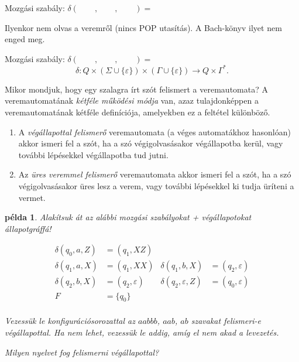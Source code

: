 \documentclass[a4paper]{article}
\newtheorem{pelda}{példa}[section]
\begin{document}
Mozgási szabály: $\delta(\qquad, \qquad, \qquad) = $\\[2em]

 \qquad
\begin{minipage}{.5\linewidth}
    Ilyenkor nem olvas a veremről (nincs POP utasítás). A Bach-könyv
    ilyet nem enged meg.
\end{minipage}

Mozgási szabály: $\delta(\qquad, \qquad, \qquad) = $\\[2em]

\[\delta:
 Q\times (\Sigma \cup \{\varepsilon\}) \times (\Gamma \cup \{\varepsilon\})
 \longrightarrow
 Q \times \Gamma^*.
\]

Mikor mondjuk, hogy egy szalagra írt szót felismert a veremautomata?
A veremautomatának \emph{kétféle működési módja} van, azaz
tulajdonképpen a veremautomatának kétféle definíciója, amelyekben ez a
feltétel különböző.
\begin{enumerate}
    \item A \emph{végállapottal felismerő} veremautomata (a véges
        automatákhoz hasonlóan) akkor ismeri fel a szót, ha a szó
        végigolvasásakor végállapotba kerül, vagy további lépésekkel
        végállapotba tud jutni.
    \item Az \emph{üres veremmel felismerő} veremautomata akkor ismeri
        fel a szót, ha a szó végigolvasásakor üres lesz a verem, vagy
        további lépésekkel ki tudja üríteni a vermet.
\end{enumerate}

\begin{pelda}
Alakítsuk át az alábbi mozgási szabályokat + végállapotokat állapotgráffá!

\begin{align*}
\delta(q_0, a, Z) &= (q_1, XZ)\\
\delta(q_1, a, X) &= (q_1, XX)&
\delta(q_1, b, X) &= (q_2, \varepsilon)\\
\delta(q_2, b, X) &= (q_2, \varepsilon)&
\delta(q_2, \varepsilon, Z) &= (q_0, \varepsilon)\\
F &= \{q_0\}&&\\
\end{align*}

Vezessük le konfigurációsorozattal az $aabbb$, $aab$, $ab$ szavakat
felismeri-e végállapottal. Ha nem lehet, vezessük le addig, amíg el nem
akad a levezetés.

Milyen nyelvet fog felismerni végállapottal?
\end{pelda}
\end{document}
